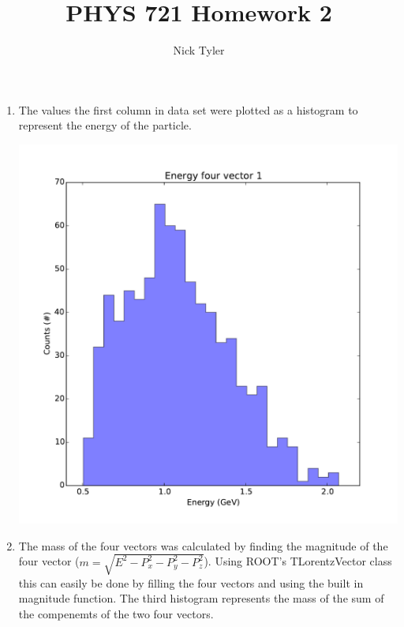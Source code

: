 \documentclass[pdftex]{article}
\title{PHYS 721 Homework 2}
\author{Nick Tyler}
\date{}
\begin{document}
\maketitle
\begin{enumerate}
	\item The values the first column in data set were plotted as a histogram
	to represent the energy of the particle. \\
	\parbox{\linewidth}{\centering
		\includegraphics[scale=0.5]{Problem_1.pdf}\\
	}
	\newpage
	\item The mass of the four vectors was calculated by finding the magnitude of the four vector 
	($m = \sqrt{E^2 - P_x^2 - P_y^2 - P_z^2}$).
	Using ROOT's TLorentzVector class this can easily be done by filling the four vectors and 
	using the built in magnitude function.  The third histogram represents the mass of the sum
	of the compenemts of the two four vectors.\\
	\parbox{\linewidth}{\centering
}
\end{enumerate}
\end{document}
